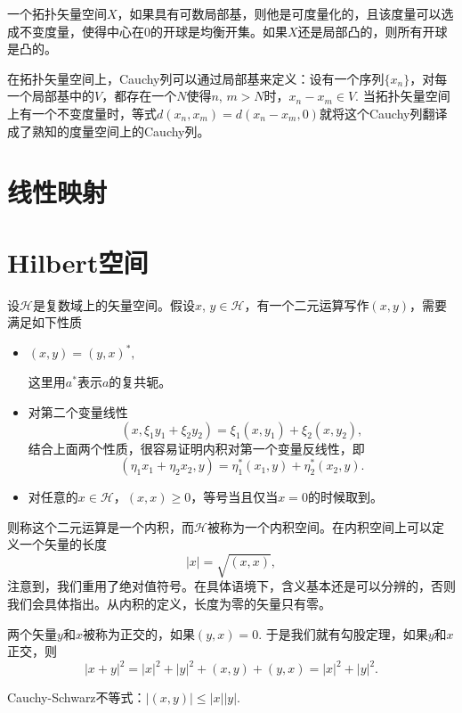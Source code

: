 \begin{thm}
一个拓扑矢量空间$X$，如果具有可数局部基，则他是可度量化的，且该度量可以选成不变度量，使得中心在$0$的开球是均衡开集。如果$X$还是局部凸的，则所有开球是凸的。
\end{thm}\notprove

\begin{para}
在拓扑矢量空间上，Cauchy列可以通过局部基来定义：设有一个序列$\{x_n\}$，对每一个局部基中的$V$，都存在一个$N$使得$n$, $m>N$时，$x_n-x_m\in V$. 当拓扑矢量空间上有一个不变度量时，等式$d(x_n,x_m)=d(x_n-x_m,0)$就将这个Cauchy列翻译成了熟知的度量空间上的Cauchy列。
\end{para}

\section{线性映射}

\section{Hilbert空间}

设$\mathcal{H}$是复数域上的矢量空间。假设$x$, $y\in \mathcal{H}$，有一个二元运算写作$(x,y)$，需要满足如下性质
\begin{itemize}
\item $(x,y)=(y,x)^*,$

这里用$a^*$表示$a$的复共轭。

\item 对第二个变量线性
\[
(x,\xi_1y_1+\xi_2y_2)=\xi_1(x,y_1)+\xi_2(x,y_2),
\]
结合上面两个性质，很容易证明内积对第一个变量反线性，即
\[
(\eta_1x_1+\eta_2x_2,y)=\eta_1^*(x_1,y)+\eta_2^*(x_2,y).
\]
\item 对任意的$x\in \mathcal{H}$，$(x,x)\geq 0$，等号当且仅当$x=0$的时候取到。
\end{itemize}

则称这个二元运算是一个内积，而$\mathcal{H}$被称为一个内积空间。在内积空间上可以定义一个矢量的长度
\[
	|x|=\sqrt{(x,x)},
\]
注意到，我们重用了绝对值符号。在具体语境下，含义基本还是可以分辨的，否则我们会具体指出。从内积的定义，长度为零的矢量只有零。

\begin{para}
两个矢量$y$和$x$被称为正交的，如果$(y,x)=0$. 于是我们就有勾股定理，如果$y$和$x$正交，则
\[
	|x+y|^2=|x|^2+|y|^2+(x,y)+(y,x)=|x|^2+|y|^2.
\]
\end{para}

\begin{pro}
Cauchy-Schwarz不等式：$|(x,y)|\leq |x||y|$.
\end{pro}

